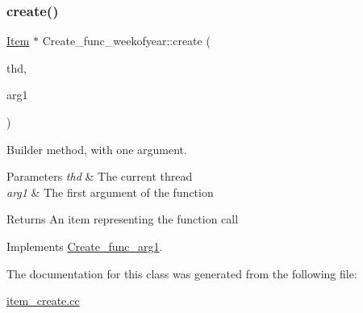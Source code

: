 \subsubsection{\texorpdfstring{create()}{create()}}
{\footnotesize\ttfamily \mbox{\hyperlink{classItem}{Item}} $\ast$ Create\+\_\+func\+\_\+weekofyear\+::create (\begin{DoxyParamCaption}\item[{T\+HD $\ast$}]{thd,  }\item[{\mbox{\hyperlink{classItem}{Item}} $\ast$}]{arg1 }\end{DoxyParamCaption})\hspace{0.3cm}{\ttfamily [virtual]}}

Builder method, with one argument. 
\begin{DoxyParams}{Parameters}
{\em thd} & The current thread \\
\hline
{\em arg1} & The first argument of the function \\
\hline
\end{DoxyParams}
\begin{DoxyReturn}{Returns}
An item representing the function call 
\end{DoxyReturn}


Implements \mbox{\hyperlink{classCreate__func__arg1_a3e9a98f755cd82c3e762e334c955a8c9}{Create\+\_\+func\+\_\+arg1}}.



The documentation for this class was generated from the following file\+:\begin{DoxyCompactItemize}
\item 
\mbox{\hyperlink{item__create_8cc}{item\+\_\+create.\+cc}}\end{DoxyCompactItemize}
